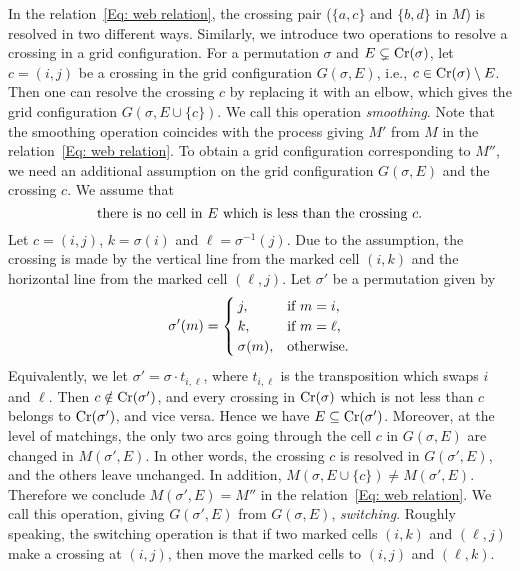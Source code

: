 In the relation~\eqref{Eq: web relation}, the crossing pair
(\( \{a,c\} \) and \( \{b,d\} \) in \( M \)) is resolved in two different ways.
Similarly, we introduce two operations to resolve a crossing in a grid
configuration. 
For a permutation \( \sigma \) and \( E\subsetneq\operatorname{Cr}(\sigma) \),
let $c=(i,j)$ be a  crossing in the grid configuration $G(\sigma,E)$,
i.e., \( c\in\operatorname{Cr}(\sigma)\setminus E \).
Then one can resolve the crossing \( c \) by replacing it with an elbow,
which gives the grid configuration \( G(\sigma,E\cup \{c\}) \).
We call this operation \emph{smoothing}.
Note that the smoothing operation coincides with the process giving \( M' \) from
\( M \) in the relation~\eqref{Eq: web relation}.
To obtain a grid configuration corresponding to \( M'' \), we need an additional
assumption on the grid configuration \( G(\sigma, E) \) and the crossing \( c \).
We assume that
\begin{equation} \label{cond:switching_condition}
  \mbox{there is no cell in \( E \) which is less than the crossing \( c \).}
\end{equation}
Let \( c=(i,j) \), \( k=\sigma(i) \) and \( \ell=\sigma^{-1}(j) \).
Due to the assumption, the crossing is made by the vertical line
from the marked cell \( (i, k) \) and the horizontal line from the marked cell
\( (\ell,j) \).
Let \( \sigma' \) be a permutation given by
\[
  \sigma'(m) =
  \begin{cases}
    j, & \mbox{if \( m=i \),} \\
    k, & \mbox{if \( m=\ell \),} \\
    \sigma(m), & \mbox{otherwise.}
  \end{cases}
\]
Equivalently, we let \( \sigma'=\sigma \cdot t_{i,\ell} \),
where \( t_{i,\ell} \) is the transposition which swaps \( i \) and \( \ell \).
Then \( c\notin \operatorname{Cr}(\sigma') \), and every crossing in \( \operatorname{Cr}(\sigma) \) which
is not less than \( c \) belongs to \( \operatorname{Cr}(\sigma') \), and vice versa.
Hence we have \( E\subseteq \operatorname{Cr}(\sigma') \).
Moreover, at the level of matchings, the only two arcs going through the cell
\( c \) in \( G(\sigma,E) \) are changed in \( M(\sigma',E) \).
In other words, the crossing \( c \) is resolved in \( G(\sigma',E) \), and
the others leave unchanged. In addition, \( M(\sigma,E\cup\{c\})\neq M(\sigma',E)\).
Therefore we conclude \( M(\sigma',E) = M'' \) in the relation~\eqref{Eq: web relation}.
We call this operation, giving \( G(\sigma',E) \) from \( G(\sigma,E) \), \emph{switching}.
Roughly speaking, the switching operation is that if two marked cells \( (i,k) \) and
\( (\ell,j) \) make a crossing at \( (i,j) \), then move the marked cells
to \( (i,j) \) and \( (\ell,k) \).

